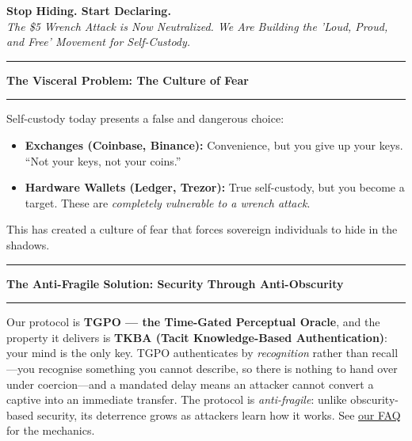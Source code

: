 \documentclass[8pt]{article}
\newcommand{\faqurl}{https://loudproudandfree.com}
\begin{document}
\pagestyle{empty}
\enlargethispage{5\baselineskip}

\begin{center}
  \vspace*{-1cm}
  {\huge\bfseries\color{accent} Stop Hiding. Start Declaring.}\\[0.6ex]
  {\large\itshape The \$5 Wrench Attack is Now Neutralized. We Are Building the 'Loud, Proud, and Free' Movement for Self-Custody.}
\end{center}

\vspace{0.28cm}

{\color{accent}\hrule}
\vspace{0.2cm}
{\Large\textbf{The Visceral Problem: The Culture of Fear}}
\vspace{0.2cm}
{\color{accent}\hrule}
\vspace{0.22cm}

\noindent Self-custody today presents a false and dangerous choice:
\begin{itemize}
  \item \textbf{Exchanges (Coinbase, Binance):} Convenience, but you give up your keys. ``Not your keys, not your coins.''
  \item \textbf{Hardware Wallets (Ledger, Trezor):} True self-custody, but you become a target. These are \emph{completely vulnerable to a wrench attack}.
\end{itemize}
This has created a culture of fear that forces sovereign individuals to hide in the shadows.

\vspace{0.28cm}

{\color{accent}\hrule}
\vspace{0.2cm}
{\Large\textbf{The Anti-Fragile Solution: Security Through Anti-Obscurity}}
\vspace{0.2cm}
{\color{accent}\hrule}
\vspace{0.22cm}

\noindent Our protocol is \textbf{TGPO --- the Time-Gated Perceptual Oracle}, and the property it delivers is \textbf{TKBA (Tacit Knowledge-Based Authentication)}: your mind is the only key. TGPO authenticates by \emph{recognition} rather than recall---you recognise something you cannot describe, so there is nothing to hand over under coercion---and a mandated delay means an attacker cannot convert a captive into an immediate transfer. The protocol is \emph{anti-fragile}: unlike obscurity-based security, its deterrence grows as attackers learn how it works. See \href{\faqurl}{our FAQ} for the mechanics.
\end{document}
